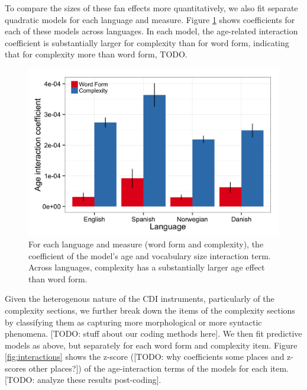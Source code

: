 \documentclass[10pt,letterpaper]{article}
\begin{document}
To compare the sizes of these fan effects more quantitatively, we also fit separate quadratic models for each language and measure. Figure \ref{fig:coefs_grammar} shows coefficients for each of these models across languages. In each model, the age-related interaction coefficient is substantially larger for complexity than for word form, indicating that for complexity more than word form, TODO.

\begin{figure}[tb]
\begin{center}
\includegraphics[width=\linewidth]{plots/coefs_wordform_complexity.png}
\end{center}
\caption{\label{fig:coefs_grammar}  For each language and measure (word form and complexity), the coefficient of the model's age and vocabulary size interaction term. Across languages, complexity has a substantially larger age effect than word form.} 
\end{figure}

Given the heterogenous nature of the CDI instruments, particularly of the complexity sections, we further break down the items of the complexity sections by classifying them as capturing more morphological or more syntactic phenomena. [TODO: stuff about our coding methods here]. We then fit predictive models as above, but separately for each word form and complexity item. Figure \ref{fig:interactions} shows the z-score ([TODO: why coefficients some places and z-scores other places?]) of the age-interaction terms of the models for each item. [TODO: analyze these results post-coding].
\end{document}
